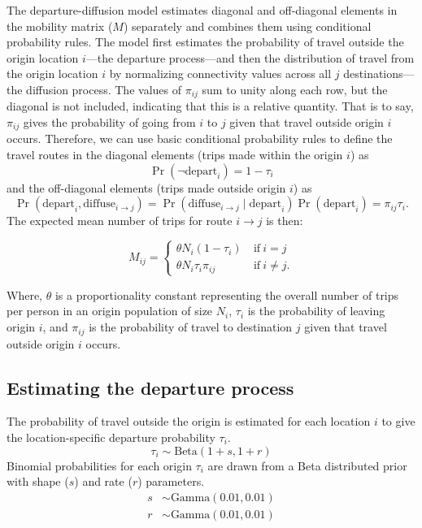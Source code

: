 \documentclass[
]{book}
\begin{document}
The departure-diffusion model estimates diagonal and off-diagonal elements in the mobility matrix (\(M\)) separately and combines them using conditional probability rules. The model first estimates the probability of travel outside the origin location \(i\)---the departure process---and then the distribution of travel from the origin location \(i\) by normalizing connectivity values across all \(j\) destinations---the diffusion process. The values of \(\pi_{ij}\) sum to unity along each row, but the diagonal is not included, indicating that this is a relative quantity. That is to say, \(\pi_{ij}\) gives the probability of going from \(i\) to \(j\) given that travel outside origin \(i\) occurs. Therefore, we can use basic conditional probability rules to define the travel routes in the diagonal elements (trips made within the origin \(i\)) as
\[
\Pr( \neg \text{depart}_i ) =  1 - \tau_i
\]
and the off-diagonal elements (trips made outside origin \(i\)) as
\[
\Pr( \text{depart}_i, \text{diffuse}_{i \rightarrow j}) = \Pr( \text{diffuse}_{i \rightarrow j} \mid \text{depart}_i ) \Pr(\text{depart}_i ) = \pi_{ij} \tau_i.
\]
The expected mean number of trips for route \(i \rightarrow j\) is then:

\begin{equation}
M_{ij} = 
\begin{cases}
\theta N_i (1-\tau_i) \ & \text{if} \ i = j \\
\theta N_i \tau_i \pi_{ij} \ & \text{if} \ i \ne j.
\end{cases}
\label{eq:M}
\end{equation}

Where, \(\theta\) is a proportionality constant representing the overall number of trips per person in an origin population of size \(N_i\), \(\tau_i\) is the probability of leaving origin \(i\), and \(\pi_{ij}\) is the probability of travel to destination \(j\) given that travel outside origin \(i\) occurs.

\subsection{Estimating the departure process}\label{estimating-the-departure-process}

The probability of travel outside the origin is estimated for each location \(i\) to give the location-specific departure probability \(\tau_i\).
\[
\tau_i \sim \text{Beta}(1+s, 1+r)
\]
Binomial probabilities for each origin \(\tau_i\) are drawn from a Beta distributed prior with shape (\(s\)) and rate (\(r\)) parameters.
\[
\begin{aligned}
s &\sim \text{Gamma}(0.01, 0.01)\\
r &\sim \text{Gamma}(0.01, 0.01)
\end{aligned}
\]
\end{document}
